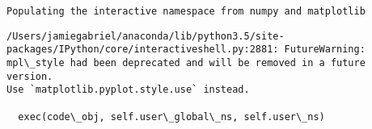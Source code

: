 \documentclass[11pt]{article}
\begin{document}
    \begin{Verbatim}[commandchars=\\\{\}]
Populating the interactive namespace from numpy and matplotlib

    \end{Verbatim}

    \begin{Verbatim}[commandchars=\\\{\}]
/Users/jamiegabriel/anaconda/lib/python3.5/site-packages/IPython/core/interactiveshell.py:2881: FutureWarning: 
mpl\_style had been deprecated and will be removed in a future version.
Use `matplotlib.pyplot.style.use` instead.

  exec(code\_obj, self.user\_global\_ns, self.user\_ns)

    \end{Verbatim}
\end{document}
